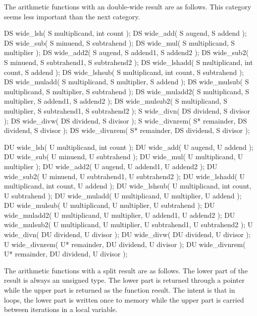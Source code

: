 The arithmetic functions with an double-wide result are as follows. This category seems less important than the next category.

\begin{itemdecl}
DS wide_lsh( S multiplicand, int count );
DS wide_add( S augend, S addend );
DS wide_sub( S minuend, S subtrahend );
DS wide_mul( S multiplicand, S multiplier );
DS wide_add2( S augend, S addend1, S addend2 );
DS wide_sub2( S minuend, S subtrahend1, S subtrahend2 );
DS wide_lshadd( S multiplicand, int count, S addend );
DS wide_lshsub( S multiplicand, int count, S subtrahend );
DS wide_muladd( S multiplicand, S multiplier, S addend );
DS wide_mulsub( S multiplicand, S multiplier, S subtrahend );
DS wide_muladd2( S multiplicand, S multiplier, S addend1, S addend2 );
DS wide_mulsub2( S multiplicand, S multiplier, S subtrahend1, S subtrahend2 );
S wide_divn( DS dividend, S divisor );
DS wide_divw( DS dividend, S divisor );
S wide_divnrem( S* remainder, DS dividend, S divisor );
DS wide_divnrem( S* remainder, DS dividend, S divisor );

DU wide_lsh( U multiplicand, int count );
DU wide_add( U augend, U addend );
DU wide_sub( U minuend, U subtrahend );
DU wide_mul( U multiplicand, U multiplier );
DU wide_add2( U augend, U addend1, U addend2 );
DU wide_sub2( U minuend, U subtrahend1, U subtrahend2 );
DU wide_lshadd( U multiplicand, int count, U addend );
DU wide_lshsub( U multiplicand, int count, U subtrahend );
DU wide_muladd( U multiplicand, U multiplier, U addend );
DU wide_mulsub( U multiplicand, U multiplier, U subtrahend );
DU wide_muladd2( U multiplicand, U multiplier, U addend1, U addend2 );
DU wide_mulsub2( U multiplicand, U multiplier, U subtrahend1, U subtrahend2 );
U wide_divn( DU dividend, U divisor );
DU wide_divw( DU dividend, U divisor );
U wide_divnrem( U* remainder, DU dividend, U divisor );
DU wide_divnrem( U* remainder, DU dividend, U divisor );		
\end{itemdecl}

The arithmetic functions with a split result are as follows. The lower part of the result is always an unsigned type. The lower part is returned through a pointer while the upper part is returned as the function result. The intent is that in loops, the lower part is written once to memory while the upper part is carried between iterations in a local variable.

